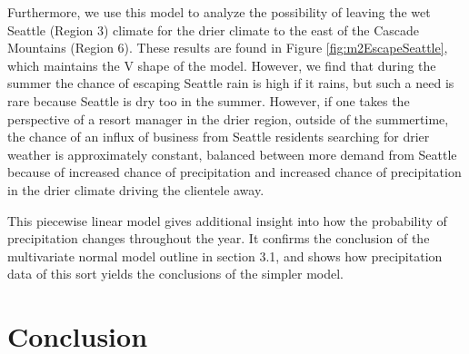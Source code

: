 \documentclass{article}
\begin{document}
Furthermore, we use this model to analyze the possibility of leaving the wet Seattle (Region 3) climate for the drier climate to the east of the Cascade Mountains (Region 6). These results are found in Figure \ref{fig:m2EscapeSeattle}, which maintains the V shape of the model. However, we find that during the summer the chance of escaping Seattle rain is high if it rains, but such a need is rare because Seattle is dry too in the summer. 
However, if one takes the perspective of a resort manager in the drier region, outside of the summertime, the chance of an influx of business from Seattle residents searching for drier weather is approximately constant, balanced between more demand from Seattle because of increased chance of precipitation and increased chance of precipitation in the drier climate driving the clientele away.

This piecewise linear model gives additional insight into how the probability of precipitation changes throughout the year. It confirms the conclusion of the multivariate normal model outline in section 3.1, and shows how precipitation data of this sort yields the conclusions of the simpler model. 

\section{Conclusion}
\end{document}
